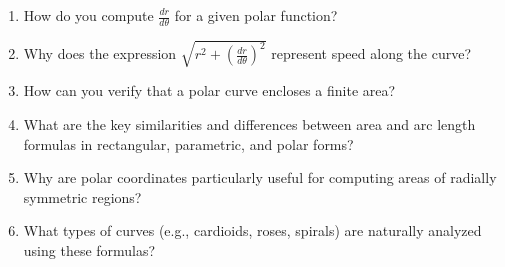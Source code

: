 \begin{enumerate}
  \item How do you compute \(\frac{dr}{d\theta}\) for a given polar function?
  \item Why does the expression \(\sqrt{r^{2} + \left(\frac{dr}{d\theta}\right)^{2}}\) represent speed along the curve?
  \item How can you verify that a polar curve encloses a finite area?
  \item What are the key similarities and differences between area and arc length formulas in rectangular, parametric, and polar forms?
  \item Why are polar coordinates particularly useful for computing areas of radially symmetric regions?
  \item What types of curves (e.g., cardioids, roses, spirals) are naturally analyzed using these formulas?
\end{enumerate}
